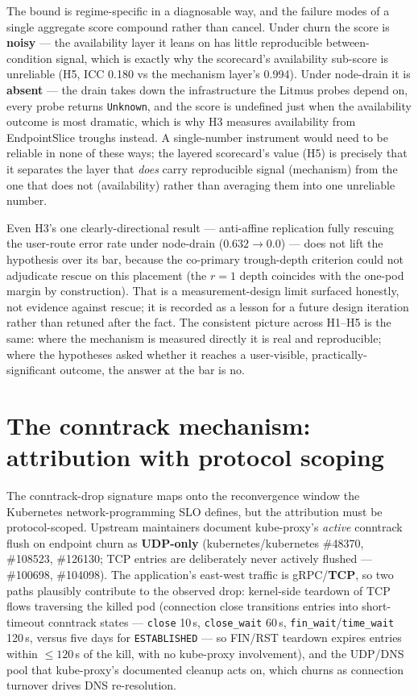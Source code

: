 The bound is regime-specific in a diagnosable way, and the failure modes of a
single aggregate score compound rather than cancel. Under churn the score is
\textbf{noisy} --- the availability layer it leans on has little reproducible
between-condition signal, which is exactly why the scorecard's availability
sub-score is unreliable (H5, ICC 0.180 vs the mechanism layer's 0.994). Under
node-drain it is \textbf{absent} --- the drain takes down the infrastructure the
Litmus probes depend on, every probe returns \texttt{Unknown}, and the score is
undefined just when the availability outcome is most dramatic, which is why H3
measures availability from EndpointSlice troughs instead. A single-number
instrument would need to be reliable in none of these ways; the layered
scorecard's value (H5) is precisely that it separates the layer that
\emph{does} carry reproducible signal (mechanism) from the one that does not
(availability) rather than averaging them into one unreliable number.

Even H3's one clearly-directional result --- anti-affine replication fully
rescuing the user-route error rate under node-drain ($0.632 \rightarrow 0.0$)
--- does not lift the hypothesis over its bar, because the
co-primary trough-depth criterion could not adjudicate rescue on this placement
(the $r{=}1$ depth coincides with the one-pod margin by construction). That is a
measurement-design limit surfaced honestly, not evidence against rescue; it is
recorded as a lesson for a future design iteration rather than retuned after the
fact. The consistent picture across H1--H5 is the same: where the mechanism is
measured directly it is real and reproducible; where the hypotheses asked
whether it reaches a user-visible, practically-significant outcome, the
answer at the bar is no.

\section{The conntrack mechanism: attribution with protocol scoping}\label{sec:h2-mechanism}

The conntrack-drop signature maps onto the reconvergence window the Kubernetes
network-programming SLO defines, but the attribution must be protocol-scoped.
Upstream maintainers document kube-proxy's \emph{active} conntrack flush on
endpoint churn as \textbf{UDP-only} (kubernetes/kubernetes \#48370, \#108523,
\#126130; TCP entries are deliberately never actively flushed --- \#100698,
\#104098). The application's east-west traffic is gRPC/\textbf{TCP}, so two paths
plausibly contribute to the observed drop: kernel-side teardown of TCP flows
traversing the killed pod (connection close transitions entries into
short-timeout conntrack states --- \texttt{close} 10\,s, \texttt{close\_wait}
60\,s, \texttt{fin\_wait}/\texttt{time\_wait} 120\,s, versus five days for
\texttt{ESTABLISHED} --- so FIN/RST teardown expires entries within $\le 120$\,s of
the kill, with no kube-proxy involvement), and the UDP/DNS pool that
kube-proxy's documented cleanup acts on, which churns as connection turnover
drives DNS re-resolution.

